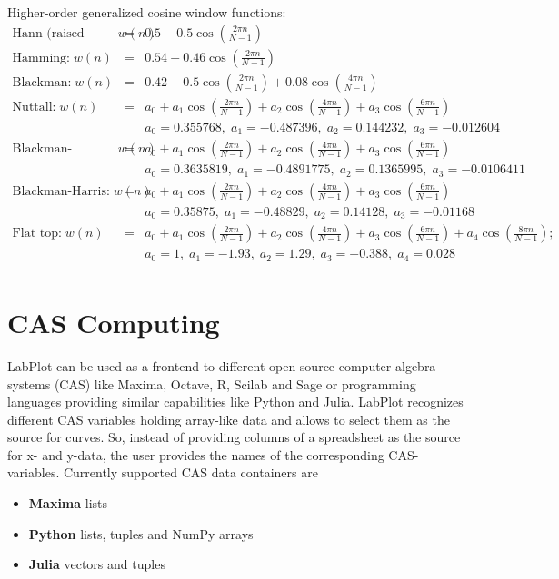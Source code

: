 Higher-order generalized cosine window functions:
\begin{eqnarray*}
\text{Hann (raised cosine):} \;  w(n) &=& 0.5 - 0.5 \cos \left(\frac{2 \pi n}{N-1}\right) \\
%
\text{Hamming:} \;  w(n) &=& 0.54 - 0.46 \cos\left( \frac{2\pi n}{N-1} \right) \\
%
\text{Blackman:} \;  w(n) &=& 0.42 - 0.5 \cos\left(\frac{2\pi n}{N-1}\right) + 0.08 \cos\left(\frac{4\pi n}{N-1} \right) \\
%
\text{Nuttall:} \;  w(n) &=& a_0 + a_1 \cos\left(\frac{2\pi n}{N-1}\right) + a_2 \cos\left(\frac{4\pi n}{N-1}\right) + a_3 \cos\left(\frac{6\pi n}{N-1}\right) \\
&& a_0 = 0.355768,\; a_1 =  -0.487396,\; a_2 = 0.144232,\; a_3 = -0.012604 \\
%
\text{Blackman-Nuttall:} \;  w(n) &=& a_0 + a_1 \cos\left(\frac{2\pi n}{N-1}\right) + a_2 \cos\left(\frac{4\pi n}{N-1}\right) + a_3 \cos\left(\frac{6\pi n}{N-1}\right) \\
&& a_0 = 0.3635819,\; a_1 =  -0.4891775,\; a_2 = 0.1365995,\; a_3 = -0.0106411 \\
%
\text{Blackman-Harris:} \;  w(n) &=& a_0 + a_1 \cos\left(\frac{2\pi n}{N-1}\right) + a_2 \cos\left(\frac{4\pi n}{N-1}\right) + a_3 \cos\left(\frac{6\pi n}{N-1}\right) \\
&& a_0 = 0.35875,\; a_1 =  -0.48829,\; a_2 = 0.14128,\; a_3 = -0.01168 \\
%
\text{Flat top:} \;  w(n) &=& a_0 + a_1 \cos\left(\frac{2\pi n}{N-1}\right) + a_2 \cos\left(\frac{4\pi n}{N-1}\right) +a_3 \cos\left(\frac{6\pi n}{N-1}\right) + a_4 \cos\left(\frac{8\pi n}{N-1}\right); \\
&& a_0 = 1, \; a_1 =  -1.93,\; a_2 = 1.29,\; a_3 = -0.388,\; a_4 = 0.028 \\
\end{eqnarray*}


\chapter{CAS Computing}
LabPlot can be used as a frontend to different open-source computer algebra systems (CAS) like Maxima, Octave, R, Scilab and Sage  or programming languages providing similar capabilities like Python and Julia. LabPlot recognizes different CAS variables holding array-like data and allows to select them as the source for curves. So, instead of providing columns of a spreadsheet as the source for x- and y-data, the user provides the names of the corresponding CAS-variables. Currently supported CAS data containers are
\begin{itemize}
\item \textbf{Maxima} lists
\item \textbf{Python} lists, tuples and NumPy arrays
\item \textbf{Julia} vectors and tuples
\end{itemize}

